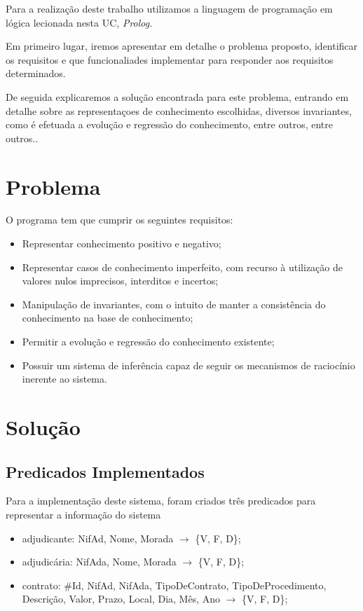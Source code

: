 \documentclass[a4paper]{report}
\begin{document}
Para a realização deste trabalho utilizamos a linguagem de programação em lógica
lecionada nesta UC, \textit{Prolog}.

Em primeiro lugar, iremos apresentar em detalhe o problema proposto, identificar
os requisitos e que funcionaliades implementar para responder aos requisitos
determinados.

De seguida explicaremos a solução encontrada para este problema, entrando em
detalhe sobre as representaçoes de conhecimento escolhidas, diversos
invariantes, como é efetuada a evolução e regressão do conhecimento, entre
outros, entre outros..

\chapter{Problema}

O programa tem que cumprir os seguintes requisitos:
\begin{itemize}
        \item Representar conhecimento positivo e negativo;
        \item Representar casos de conhecimento imperfeito, com recurso à
            utilização de valores nulos imprecisos, interditos e incertos;
        \item Manipulação de invariantes, com o intuito de manter a consistência
            do conhecimento na base de conhecimento;
        \item Permitir a evolução e regressão do conhecimento existente;
        \item Possuir um sistema de inferência capaz de seguir os mecanismos de
            raciocínio inerente ao sistema.
\end{itemize}

\chapter{Solução}

\section{Predicados Implementados}

Para a implementação deste sistema, foram criados três predicados para
representar a informação do sistema
\begin{itemize}
    \item adjudicante: NifAd, Nome, Morada $\rightarrow$ \{V, F, D\};
    \item adjudicária: NifAda, Nome, Morada $\rightarrow$ \{V, F, D\};
    \item contrato: \#Id, NifAd, NifAda, TipoDeContrato,
        TipoDeProcedimento, Descrição, Valor, Prazo, Local, Dia, Mês, Ano 
        $\rightarrow$ \{V, F, D\};
\end{itemize}
\end{document}
